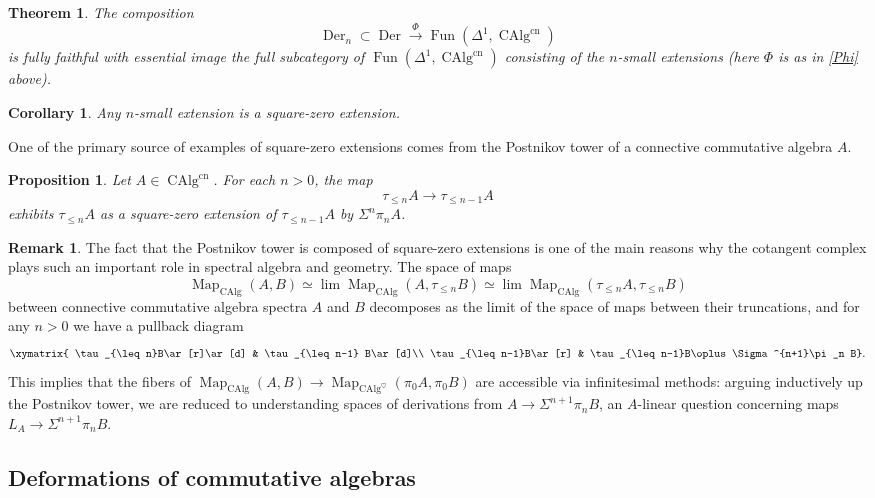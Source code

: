 \documentclass[12pt]{article}
\newtheorem{theorem}{Theorem}[subsection]
\newtheorem{corollary}{Corollary}[subsection]
\newtheorem{proposition}{Proposition}[subsection]
\theoremstyle{definition}
\newtheorem{remark}{Remark}[subsection]
\newcommand{\too}{\longrightarrow}
\DeclareMathOperator{\CAlg}{CAlg}
\DeclareMathOperator{\Der}{Der}
\DeclareMathOperator{\Fun}{Fun}
\DeclareMathOperator{\Map}{Map}
\newcommand{\cn}{\mathrm{cn}}
\begin{document}
\begin{theorem}{\em \cite[Theorem 7.4.1.26]{HA}}
The composition
\[
\Der_n\subset\Der\overset{\Phi}{\too}\Fun(\Delta^1,\CAlg^{\cn})
\]
is fully faithful with essential image the full subcategory of $\Fun(\Delta^1,\CAlg^{\cn})$ consisting of the $n$-small extensions (here $\Phi$ is as in \autoref{Phi} above).
\end{theorem}

\begin{corollary}
Any $n$-small extension is a square-zero extension.
\end{corollary}
One of the primary source of examples of square-zero extensions comes from the Postnikov tower of a connective commutative algebra $A$.
\begin{proposition}{\em \cite[Corollary 7.4.1.28]{HA}}
Let $A\in\CAlg^{\cn}$.
For each $n>0$, the map
\[
\tau_{\leq n}A\too\tau_{\leq n-1}A
\]
exhibits $\tau_{\leq n}A$ as a square-zero extension of $\tau_{\leq n-1} A$ by $\Sigma^n\pi_{n} A$.
\end{proposition}

\begin{remark}
The fact that the Postnikov tower is composed of square-zero extensions is one of the main reasons why the cotangent complex plays such an important role in spectral algebra and geometry.
The space of maps
\[
\Map_{\CAlg}(A,B)\simeq\lim\Map_{\CAlg}(A,\tau_{\leq n} B)\simeq\lim\Map_{\CAlg}(\tau_{\leq n}A,\tau_{\leq n}B)
\]
between connective commutative algebra spectra $A$ and $B$ decomposes as the limit of the space of maps between their truncations, and for any $n>0$ we have a pullback diagram
\[
\xymatrix{
\tau_{\leq n}B\ar[r]\ar[d] & \tau_{\leq n-1} B\ar[d]\\
\tau_{\leq n-1}B\ar[r] & \tau_{\leq n-1}B\oplus\Sigma^{n+1}\pi_n B}.
\]
This implies that the fibers of
$
\Map_{\CAlg}(A,B)\too\Map_{\CAlg^\heartsuit}(\pi_0 A,\pi_0 B)
$
are accessible via infinitesimal methods: arguing inductively up the Postnikov tower, we are reduced to understanding spaces of derivations from $A\to\Sigma^{n+1}\pi_nB$, an $A$-linear question concerning maps $L_A\to\Sigma^{n+1}\pi_n B$.
\end{remark}

\subsection{Deformations of commutative algebras}
\end{document}

